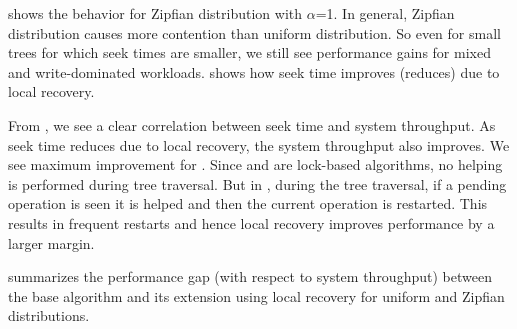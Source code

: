 


 shows the behavior for Zipfian distribution with $\alpha$=1. In general, Zipfian distribution causes more contention than uniform distribution. So even for small trees for which seek times are smaller, we still see performance gains for mixed and write-dominated workloads.  shows how seek time improves (reduces) due to local recovery. 

From , we see a clear correlation between seek time and system throughput. As seek time reduces due to local recovery, the system throughput also improves. We see maximum improvement for \HJBST{}. Since \CASTLE{} and \CITRUS{} are lock-based algorithms, no helping is performed during tree traversal.  But in \HJBST{}, during the tree traversal, if a pending operation is seen it is helped and then the current operation is restarted. This results in frequent restarts and hence local recovery improves performance by a larger margin.


 summarizes the performance gap (with respect to system throughput) between the base algorithm and its extension using local recovery for uniform and Zipfian distributions. 